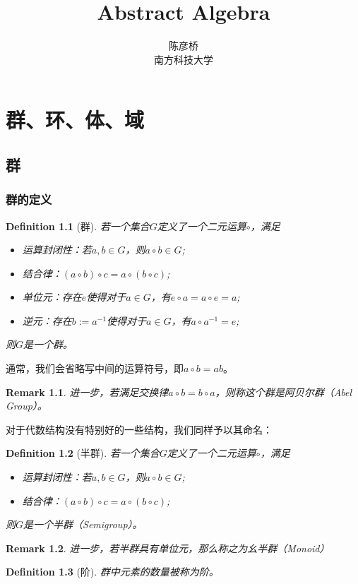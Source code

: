 \documentclass[12pt,a4paper,UTF8]{ctexbook}
\title{\bf{Abstract Algebra}}
\author{陈彦桥\\
        南方科技大学}
\theoremstyle{plain}
\newtheorem{definition}{\indent Definition}[section]
\newtheorem{remark}{\indent Remark}[section]
\begin{document}
\maketitle
\tableofcontents

\chapter{群、环、体、域}
\section{群}
\subsection{群的定义}
\begin{definition}[群]
    若一个集合$G$定义了一个二元运算$\circ$，满足
    \begin{itemize}
        \item 运算封闭性：若$a,b \in G$，则$a\circ b\in G$;
        \item 结合律：$(a\circ b)\circ c = a\circ (b\circ c)$;
        \item 单位元：存在$e$使得对于$a\in G$，有$e\circ a = a\circ e = a$;
        \item 逆元：存在$b:=a^{-1}$使得对于$a\in G$，有$a\circ a^{-1} = e$;
    \end{itemize}
    则$G$是一个群。
\end{definition}
通常，我们会省略写中间的运算符号，即$a\circ b = ab$。
\begin{remark}
    进一步，若满足交换律$a\circ b = b\circ a$，则称这个群是阿贝尔群（Abel Group）。
\end{remark}
对于代数结构没有特别好的一些结构，我们同样予以其命名：
\begin{definition}[半群]
    若一个集合$G$定义了一个二元运算$\circ$，满足
    \begin{itemize}
        \item 运算封闭性：若$a,b \in G$，则$a\circ b\in G$;
        \item 结合律：$(a\circ b)\circ c = a\circ (b\circ c)$;
    \end{itemize}
    则$G$是一个半群（Semigroup）。
\end{definition}
\begin{remark}
    进一步，若半群具有单位元，那么称之为幺半群（Monoid）
\end{remark}
\begin{definition}[阶]
    群中元素的数量被称为阶。
\end{definition}
\end{document}
